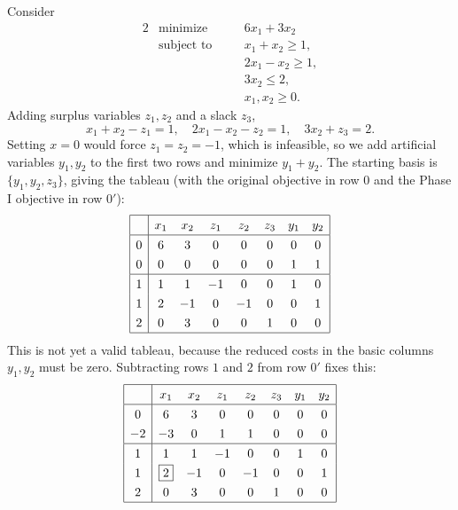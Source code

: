 \documentclass[a4paper]{scrartcl}
\begin{document}
\begin{example}
    Consider
    \begin{alignat*}{2}
        & \text{minimize} \quad && 6x_1 + 3x_2 \\
        & \text{subject to} \quad && x_1 + x_2 \geq 1, \\
        & && 2x_1 - x_2 \geq 1, \\
        & && 3x_2 \leq 2, \\
        & && x_1, x_2 \geq 0.
    \end{alignat*}
    Adding surplus variables $z_1, z_2$ and a slack $z_3$,
    $$
    x_1 + x_2 - z_1 = 1, \quad 2x_1 - x_2 - z_2 = 1, \quad 3x_2 + z_3 = 2.
    $$
    Setting $x = 0$ would force $z_1 = z_2 = -1$, which is infeasible, so we add artificial variables $y_1, y_2$ to the first two rows and minimize $y_1 + y_2$. The starting basis is $\{y_1, y_2, z_3\}$, giving the tableau (with the original objective in row $0$ and the Phase I objective in row $0'$):
    $$
    \arraycolsep=5pt\def\arraystretch{1.3}
    \begin{array}{|c|ccccccc|}\hline
        \multicolumn{1}{|c|}{} & x_1 & x_2 & z_1 & z_2 & z_3 & y_1 & y_2\\\hline
        0 & 6 & 3 & 0 & 0 & 0 & 0 & 0\\
        0 & 0 & 0 & 0 & 0 & 0 & 1 & 1\\\hline
        1 & 1 & 1 & -1 & 0 & 0 & 1 & 0\\
        1 & 2 & -1 & 0 & -1 & 0 & 0 & 1\\
        2 & 0 & 3 & 0 & 0 & 1 & 0 & 0\\\hline
    \end{array}
    $$
    This is not yet a valid tableau, because the reduced costs in the basic columns $y_1, y_2$ must be zero. Subtracting rows $1$ and $2$ from row $0'$ fixes this:
    $$
    \arraycolsep=5pt\def\arraystretch{1.3}
    \begin{array}{|c|ccccccc|}\hline
        \multicolumn{1}{|c|}{} & x_1 & x_2 & z_1 & z_2 & z_3 & y_1 & y_2\\\hline
        0 & 6 & 3 & 0 & 0 & 0 & 0 & 0\\
        -2 & -3 & 0 & 1 & 1 & 0 & 0 & 0\\\hline
        1 & 1 & 1 & -1 & 0 & 0 & 1 & 0\\
        1 & \boxed{2} & -1 & 0 & -1 & 0 & 0 & 1\\
        2 & 0 & 3 & 0 & 0 & 1 & 0 & 0\\\hline
    \end{array}
$$
\end{example}
\end{document}

